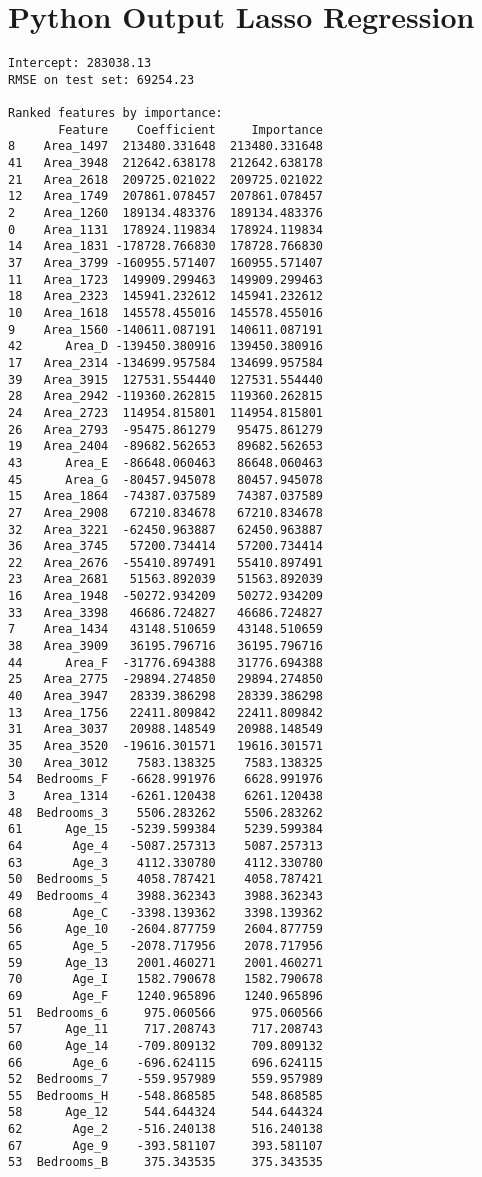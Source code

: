 \documentclass[12pt, a4paper]{report}
\begin{document}
\section*{Python Output Lasso Regression}
\begin{lstlisting}[style=pythonstyle]
Intercept: 283038.13
RMSE on test set: 69254.23

Ranked features by importance:
       Feature    Coefficient     Importance
8    Area_1497  213480.331648  213480.331648
41   Area_3948  212642.638178  212642.638178
21   Area_2618  209725.021022  209725.021022
12   Area_1749  207861.078457  207861.078457
2    Area_1260  189134.483376  189134.483376
0    Area_1131  178924.119834  178924.119834
14   Area_1831 -178728.766830  178728.766830
37   Area_3799 -160955.571407  160955.571407
11   Area_1723  149909.299463  149909.299463
18   Area_2323  145941.232612  145941.232612
10   Area_1618  145578.455016  145578.455016
9    Area_1560 -140611.087191  140611.087191
42      Area_D -139450.380916  139450.380916
17   Area_2314 -134699.957584  134699.957584
39   Area_3915  127531.554440  127531.554440
28   Area_2942 -119360.262815  119360.262815
24   Area_2723  114954.815801  114954.815801
26   Area_2793  -95475.861279   95475.861279
19   Area_2404  -89682.562653   89682.562653
43      Area_E  -86648.060463   86648.060463
45      Area_G  -80457.945078   80457.945078
15   Area_1864  -74387.037589   74387.037589
27   Area_2908   67210.834678   67210.834678
32   Area_3221  -62450.963887   62450.963887
36   Area_3745   57200.734414   57200.734414
22   Area_2676  -55410.897491   55410.897491
23   Area_2681   51563.892039   51563.892039
16   Area_1948  -50272.934209   50272.934209
33   Area_3398   46686.724827   46686.724827
7    Area_1434   43148.510659   43148.510659
38   Area_3909   36195.796716   36195.796716
44      Area_F  -31776.694388   31776.694388
25   Area_2775  -29894.274850   29894.274850
40   Area_3947   28339.386298   28339.386298
13   Area_1756   22411.809842   22411.809842
31   Area_3037   20988.148549   20988.148549
35   Area_3520  -19616.301571   19616.301571
30   Area_3012    7583.138325    7583.138325
54  Bedrooms_F   -6628.991976    6628.991976
3    Area_1314   -6261.120438    6261.120438
48  Bedrooms_3    5506.283262    5506.283262
61      Age_15   -5239.599384    5239.599384
64       Age_4   -5087.257313    5087.257313
63       Age_3    4112.330780    4112.330780
50  Bedrooms_5    4058.787421    4058.787421
49  Bedrooms_4    3988.362343    3988.362343
68       Age_C   -3398.139362    3398.139362
56      Age_10   -2604.877759    2604.877759
65       Age_5   -2078.717956    2078.717956
59      Age_13    2001.460271    2001.460271
70       Age_I    1582.790678    1582.790678
69       Age_F    1240.965896    1240.965896
51  Bedrooms_6     975.060566     975.060566
57      Age_11     717.208743     717.208743
60      Age_14    -709.809132     709.809132
66       Age_6    -696.624115     696.624115
52  Bedrooms_7    -559.957989     559.957989
55  Bedrooms_H    -548.868585     548.868585
58      Age_12     544.644324     544.644324
62       Age_2    -516.240138     516.240138
67       Age_9    -393.581107     393.581107
53  Bedrooms_B     375.343535     375.343535


\end{lstlisting}
\end{document}
